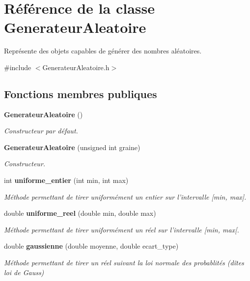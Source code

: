 \section{Référence de la classe Generateur\+Aleatoire}
\label{class_generateur_aleatoire}


Représente des objets capables de générer des nombres aléatoires.  




{\ttfamily \#include $<$Generateur\+Aleatoire.\+h$>$}

\subsection*{Fonctions membres publiques}
\begin{DoxyCompactItemize}
\item 
{\bf Generateur\+Aleatoire} ()
\begin{DoxyCompactList}\small\item\em Constructeur par défaut. \end{DoxyCompactList}\item 
{\bf Generateur\+Aleatoire} (unsigned int graine)
\begin{DoxyCompactList}\small\item\em Constructeur. \end{DoxyCompactList}\item 
int {\bf uniforme\+\_\+entier} (int min, int max)
\begin{DoxyCompactList}\small\item\em Méthode permettant de tirer uniformément un entier sur l'intervalle [min, max]. \end{DoxyCompactList}\item 
double {\bf uniforme\+\_\+reel} (double min, double max)
\begin{DoxyCompactList}\small\item\em Méthode permettant de tirer uniformément un réel sur l'intervalle [min, max[. \end{DoxyCompactList}\item 
double {\bf gaussienne} (double moyenne, double ecart\+\_\+type)
\begin{DoxyCompactList}\small\item\em Méthode permettant de tirer un réel suivant la loi normale des probablités (dîtes loi de Gauss) \end{DoxyCompactList}\end{DoxyCompactItemize}


